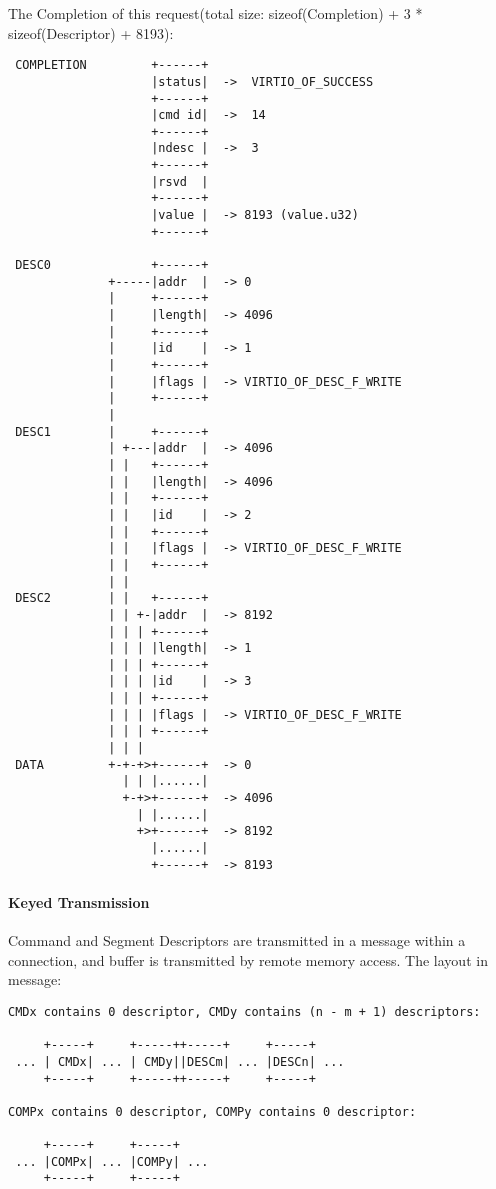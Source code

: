 The Completion of this request(total size: sizeof(Completion) + 3 * sizeof(Descriptor) + 8193):
\begin{lstlisting}
 COMPLETION         +------+
                    |status|  ->  VIRTIO_OF_SUCCESS
                    +------+
                    |cmd id|  ->  14
                    +------+
                    |ndesc |  ->  3
                    +------+
                    |rsvd  |
                    +------+
                    |value |  -> 8193 (value.u32)
                    +------+

 DESC0              +------+
              +-----|addr  |  -> 0
              |     +------+
              |     |length|  -> 4096
              |     +------+
              |     |id    |  -> 1
              |     +------+
              |     |flags |  -> VIRTIO_OF_DESC_F_WRITE
              |     +------+
              |
 DESC1        |     +------+
              | +---|addr  |  -> 4096
              | |   +------+
              | |   |length|  -> 4096
              | |   +------+
              | |   |id    |  -> 2
              | |   +------+
              | |   |flags |  -> VIRTIO_OF_DESC_F_WRITE
              | |   +------+
              | |
 DESC2        | |   +------+
              | | +-|addr  |  -> 8192
              | | | +------+
              | | | |length|  -> 1
              | | | +------+
              | | | |id    |  -> 3
              | | | +------+
              | | | |flags |  -> VIRTIO_OF_DESC_F_WRITE
              | | | +------+
              | | |
 DATA         +-+-+>+------+  -> 0
                | | |......|
                +-+>+------+  -> 4096
                  | |......|
                  +>+------+  -> 8192
                    |......|
                    +------+  -> 8193
\end{lstlisting}

\paragraph{Keyed Transmission}\label{sec:Virtio Transport Options / Virtio Over Fabrics / Transmission Protocol / Commands Definition / Keyed Transmission}
Command and Segment Descriptors are transmitted in a message within a connection, and buffer is transmitted by remote memory access.  The layout in message:

\begin{lstlisting}
CMDx contains 0 descriptor, CMDy contains (n - m + 1) descriptors:

     +-----+     +-----++-----+     +-----+
 ... | CMDx| ... | CMDy||DESCm| ... |DESCn| ...
     +-----+     +-----++-----+     +-----+

COMPx contains 0 descriptor, COMPy contains 0 descriptor:

     +-----+     +-----+
 ... |COMPx| ... |COMPy| ...
     +-----+     +-----+
\end{lstlisting}

